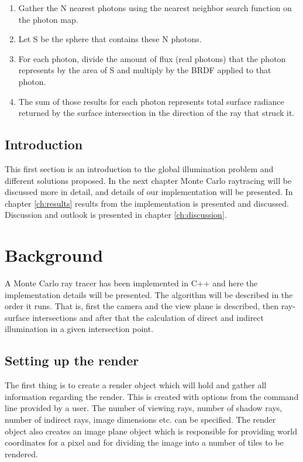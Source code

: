 \documentclass[a4paper]{report}
\begin{document}
\begin{enumerate}
\item{Gather the N nearest photons using the nearest neighbor search function on the photon map.}
\item{Let S be the sphere that contains these N photons.}
\item {For each photon, divide the amount of flux (real photons) that
    the photon represents by the area of S and multiply by the BRDF applied to that photon.}
\item{The sum of those results for each photon represents total
    surface radiance returned by the surface intersection in the
    direction of the ray that struck it.}
\end{enumerate}

\section{Introduction}
This first section is an introduction to the global illumination problem and different
solutions proposed. In the next chapter Monte Carlo raytracing will be
discussed more in detail, and details of our implementation will be
presented. In chapter \ref{ch:results} results from the implementation
is presented and discussed. Discussion and outlook is presented in chapter \ref{ch:discussion}. 

\chapter{Background}

A Monte Carlo ray tracer has been implemented in C++ and here the
implementation details will be presented. The algorithm will be
described in the order it runs. That is, first the camera and the view
plane is described, then ray-surface intersections and after that the
calculation of direct and indirect illumination in a given
intersection point.

\section{Setting up the render}

The first thing is to create a render object which will hold and
gather all information regarding the render. This is created with
options from the command line provided by a user. The number of
viewing rays, number of shadow rays, number of indirect rays, image
dimensions etc. can be specified. The render object also creates an
image plane object which is responsible for providing world
coordinates for a pixel and for dividing the image into a number of
tiles to be rendered.
\end{document}
